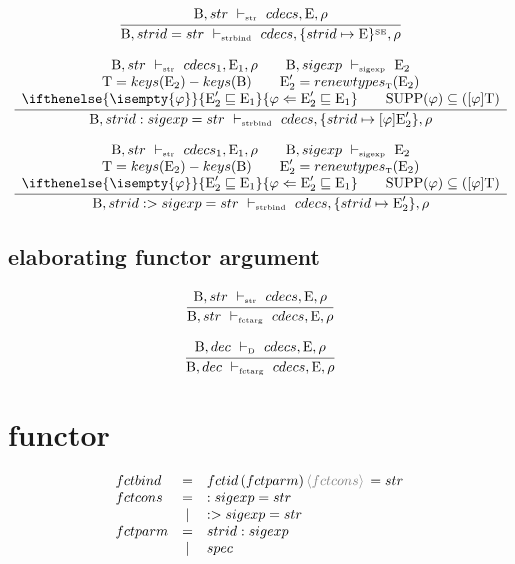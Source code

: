 \documentclass[11pt,a4paper]{article}
\newcommand{\B}  {\textrm{B}}
\newcommand{\E}  {\textrm{E}}
\newcommand{\T}  {\textrm{T}}
\newcommand{\sSE}{\textrm{\tiny SE}}
\newcommand{\vdashSigexp}  {\ \vdash_{\textrm{\tiny sigexp}}\ }
\newcommand{\vdashStr}		{\ \vdash_{\textrm{\tiny str}}\ }
\newcommand{\vdashStrBind} {\ \vdash_{\textrm{\tiny strbind}}\ }
\newcommand{\vdashFctArg}  {\ \vdash_{\textrm{\tiny fctarg}}\ }
\newcommand{\vdashD}       {\ \vdash_{\textrm{\tiny D}}\ }
\newcommand{\braced}[1]{\{#1\}}
\newcommand{\angled}[1]{\,{\color{gray}\langle#1\rangle}\,}
\newcommand{\matchEnv}[3][]{ \ifthenelse{\isempty{#1}}{#2 \sqsubseteq #3}{#1 \Leftarrow #2 \sqsubseteq #3}}
\newcommand{\SUPP}[1]{\textrm{SUPP}(#1)}
\newcommand{\KEYS}[1]{keys(#1)}
\newcommand{\TYNAMES}[1]{\KEYS{#1}}
\newcommand{\GENTYPES}[2]{renewtypes_{\textrm{\tiny $#1$}}(#2)}
\begin{document}
\[
\cfrac
 {\B, str \vdashStr cdecs, \E, \rho}
 {\B, strid = str \vdashStrBind cdecs, \braced{strid \mapsto \E}^\sSE, \rho}
\]

\[
\cfrac
 {\begin{array}{c}
  \B, str    \vdashStr    cdecs_1, \E_1, \rho    \qquad
  \B, sigexp \vdashSigexp \E_2                   \\
  \T = \TYNAMES{\E_2}-\TYNAMES{\B}               \qquad
  \E'_2 = \GENTYPES{\T}{\E_2}                    \\
  \matchEnv[\varphi]{\E'_2}{\E_1}                \qquad
  \SUPP{\varphi} \subseteq ([\varphi]\T)
  \end{array}}
 {\B, strid: sigexp = str \vdashStrBind cdecs, \braced{strid \mapsto [\varphi]\E'_2}, \rho}
\]

\[
\cfrac
 {\begin{array}{c}
  \B, str    \vdashStr    cdecs_1, \E_1, \rho    \qquad
  \B, sigexp \vdashSigexp \E_2                   \\
  \T = \TYNAMES{\E_2}-\TYNAMES{\B}               \qquad
  \E'_2 = \GENTYPES{\T}{\E_2}                    \\
  \matchEnv[\varphi]{\E'_2}{\E_1}                \qquad
  \SUPP{\varphi} \subseteq ([\varphi]\T)
  \end{array}}
 {\B, strid:>sigexp = str \vdashStrBind cdecs, \braced{strid \mapsto \E'_2}, \rho}
\]

\subsection{elaborating functor argument}
\[
\cfrac
 {\B, str \vdashStr cdecs,\E,\rho}
 {\B, str \vdashFctArg cdecs, \E, \rho}
\]

\[
\cfrac
 {\B, dec \vdashD   cdecs,\E,\rho}
 {\B, dec \vdashFctArg cdecs, \E, \rho}
\]

\section{functor}
{\renewcommand{\arraystretch}{1.2}\[
\begin{array}{lcl}
fctbind
    & = & fctid\,(fctparm) \angled{fctcons} = str \\
fctcons    
    & = & :  sigexp = str \\
    & | & :> sigexp = str \\
fctparm 
    & = & strid: sigexp                  \\
    & | & spec                           \\
\end{array}
\]}
\end{document}
